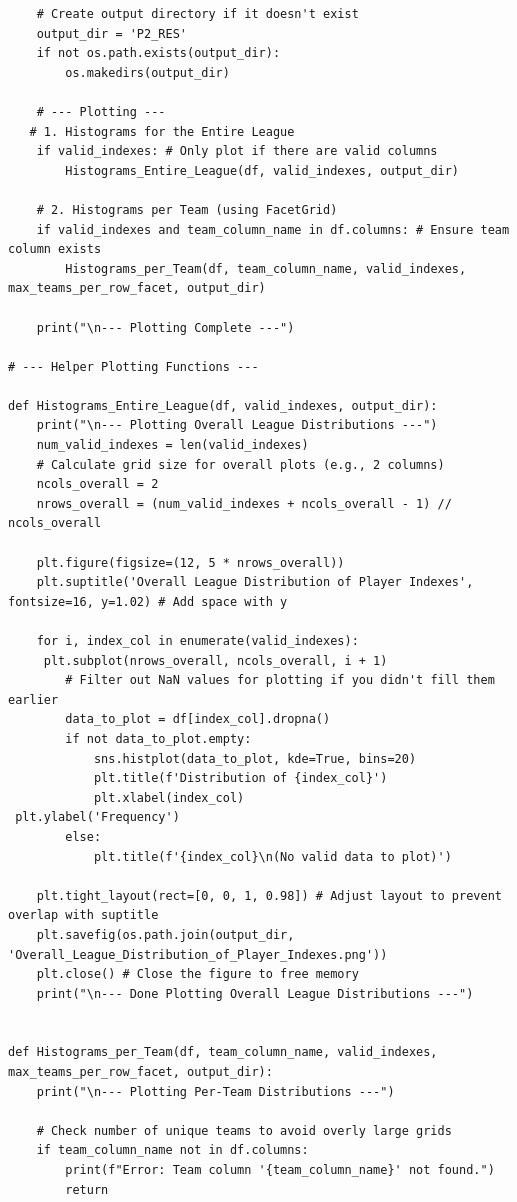 \documentclass[12pt]{report}
\begin{document}
{{\begin{lstlisting}
    # Create output directory if it doesn't exist
    output_dir = 'P2_RES'
    if not os.path.exists(output_dir):
        os.makedirs(output_dir)

    # --- Plotting ---
   # 1. Histograms for the Entire League
    if valid_indexes: # Only plot if there are valid columns
        Histograms_Entire_League(df, valid_indexes, output_dir)

    # 2. Histograms per Team (using FacetGrid)
    if valid_indexes and team_column_name in df.columns: # Ensure team column exists
        Histograms_per_Team(df, team_column_name, valid_indexes, max_teams_per_row_facet, output_dir)

    print("\n--- Plotting Complete ---")

# --- Helper Plotting Functions ---

def Histograms_Entire_League(df, valid_indexes, output_dir):
    print("\n--- Plotting Overall League Distributions ---")
    num_valid_indexes = len(valid_indexes)
    # Calculate grid size for overall plots (e.g., 2 columns)
    ncols_overall = 2
    nrows_overall = (num_valid_indexes + ncols_overall - 1) // ncols_overall

    plt.figure(figsize=(12, 5 * nrows_overall))
    plt.suptitle('Overall League Distribution of Player Indexes', fontsize=16, y=1.02) # Add space with y

    for i, index_col in enumerate(valid_indexes):
     plt.subplot(nrows_overall, ncols_overall, i + 1)
        # Filter out NaN values for plotting if you didn't fill them earlier
        data_to_plot = df[index_col].dropna()
        if not data_to_plot.empty:
            sns.histplot(data_to_plot, kde=True, bins=20)
            plt.title(f'Distribution of {index_col}')
            plt.xlabel(index_col)
 plt.ylabel('Frequency')
        else:
            plt.title(f'{index_col}\n(No valid data to plot)')

    plt.tight_layout(rect=[0, 0, 1, 0.98]) # Adjust layout to prevent overlap with suptitle
    plt.savefig(os.path.join(output_dir, 'Overall_League_Distribution_of_Player_Indexes.png'))
    plt.close() # Close the figure to free memory
    print("\n--- Done Plotting Overall League Distributions ---")


def Histograms_per_Team(df, team_column_name, valid_indexes, max_teams_per_row_facet, output_dir):
    print("\n--- Plotting Per-Team Distributions ---")

    # Check number of unique teams to avoid overly large grids
    if team_column_name not in df.columns:
        print(f"Error: Team column '{team_column_name}' not found.")
        return


\end{lstlisting}}}
\end{document}
